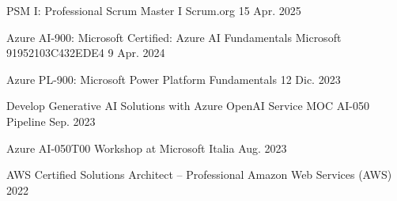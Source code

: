 

\begin{cvhonors}

  \cvhonor
  {PSM I: Professional Scrum Master I} %
  {Scrum.org} %
  {} %
  {15 Apr. 2025} %

  \cvhonor
    {Azure AI-900: Microsoft Certified: Azure AI Fundamentals} %
    {Microsoft} %
    {91952103C432EDE4} %
    {9 Apr. 2024} %

  \cvhonor
    {Azure PL-900: Microsoft Power Platform Fundamentals} %
    {} %
    {} %
    {12 Dic. 2023} %

  \cvhonor
    {Develop Generative AI Solutions with Azure OpenAI Service MOC AI-050} %
    {Pipeline} %
    {} %
    {Sep. 2023} %

  \cvhonor
    {Azure AI-050T00} %
    {Workshop at Microsoft Italia} %
    {} %
    {Aug. 2023} %

  \cvhonor
    {AWS Certified Solutions Architect – Professional} %
    {Amazon Web Services (AWS)} %
    {} %
    {2022} %


\end{cvhonors}
